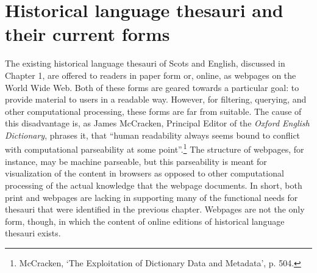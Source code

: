 \section{Historical language thesauri and their current forms}
\label{sect:Stolk_thes-digital-form:current-forms}
The existing historical language thesauri of Scots and English, discussed in Chapter 1, are offered to readers in paper form or, online, as webpages on the World Wide Web. Both of these forms are geared towards a particular goal: to provide material to users in a readable way. However, for filtering, querying, and other computational processing, these forms are far from suitable. The cause of this disadvantage is, as James McCracken, Principal Editor of the \textit{Oxford English Dictionary}, phrases it, that ``human readability always seems bound to conflict with computational parseability at some point''.\footnote{McCracken, `The Exploitation of Dictionary Data and Metadata', p. 504.} %
The structure of webpages, for instance, may be machine parseable, but this parseability is meant for visualization of the content in browsers as opposed to other computational processing of the actual knowledge that the webpage documents. In short, both print and webpages are lacking in supporting many of the functional needs for thesauri that were identified in the previous chapter. Webpages are not the only form, though, in which the content of online editions of historical language thesauri exists.


